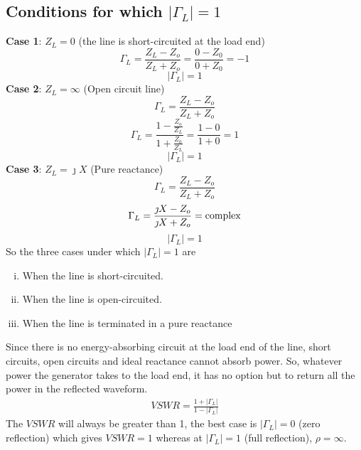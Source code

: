 \subsection{Conditions for which $|\Gamma_L|=1$}
\textbf{Case 1}: $Z_L=0$ (the line is short-circuited at the load end)
\begin{equation*}	
\Gamma_L= \frac{Z_L -Z_o}{Z_L + Z_o} =  \frac{0 -Z_0}{0 + Z_0} = -1	
\end{equation*}
\begin{equation*}
|\Gamma_L|=1
\end{equation*}	
\textbf{Case 2}: $Z_L=\infty$ (Open circuit line)
\begin{equation*}
\Gamma_L= \frac{Z_L -Z_o}{Z_L + Z_o}
\end{equation*}
\begin{equation*}
\Gamma_L = \frac{1 -\frac{Z_o}{Z_L}}{1 + \frac{Z_0}{Z_L}} = \frac{1 - 0}{1 + 0} = 1
\end{equation*}
\begin{equation*}
|\Gamma_L| = 1
\end{equation*}
\textbf{Case 3}: $Z_L = \jmath X$ (Pure reactance)
\begin{equation*}
\Gamma_L= \frac{Z_L -Z_o}{Z_L + Z_o}
\end{equation*}
\begin{equation*}
\Gamma_L = \frac{\jmath X - Z_o}{\jmath X + Z_o} = \textnormal{complex}
\end{equation*}
\begin{equation*}
|\Gamma_L| = 1
\end{equation*}
So the three cases under which $|\Gamma_L|=1$ are
\begin{enumerate}[(i)]
\item When the line is short-circuited.
\item When the line is open-circuited.
\item When the line is terminated in a pure reactance
\end{enumerate}
Since there is no energy-absorbing circuit at the load end of the line, short circuits, open circuits and ideal reactance cannot absorb power. So, whatever power the generator takes to the load end, it has no option but to return all the power in the reflected waveform.
\begin{align*}
VSWR  = \frac{1+|\Gamma_L|}{1-|\Gamma_L|}
\end{align*}
The $VSWR$ will always be greater than 1, the best case is $|\Gamma_L|=0$ (zero reflection) which gives $VSWR=1$ whereas at $|\Gamma_L|=1$ (full reflection), $\rho= \infty$.

